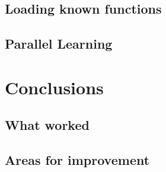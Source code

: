 \subsection{Loading known functions}

\subsection{Parallel Learning}

\section{Conclusions}

\subsection{What worked}

\subsection{Areas for improvement}

\pagebreak
%
%